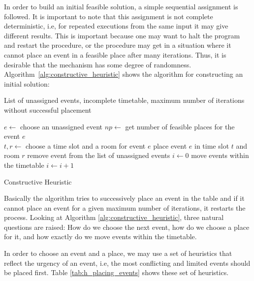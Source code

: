 In order to build an initial feasible solution, a simple sequential assignment is followed. It is important to note that this assignment is not complete deterministic, i.e, for repeated executions from the same input it may give different results. This is important because one may want to halt the program and restart the procedure, or the procedure may get in a situation where it cannot place an event in a feasible place after many iterations. Thus, it is desirable that the mechanism has some degree of randomness. Algorithm~\ref{alg:constructive_heuristic} shows the algorithm for constructing an initial solution:

\begin{algorithm}[t]
\begin{algorithmic}
\Require List of unassigned events, incomplete timetable, maximum number of iterations without successful placement 

	\State\hspace{\algorithmicindent} 
\Else
	\State $e\gets $ choose an unassigned event
	\State $np\gets $ get number of feasible places for the event $e$\\
		\State $t,r \gets $ choose a time slot and a room for event $e$
		\State place event $e$ in time slot $t$ and room $r$
		\State remove event from the list of unassigned events
		\State $i\gets 0$
	\Else
		\State move events within the timetable
		 \State $i\gets i+1$
	\EndIf
\EndIf
\EndWhile

\caption{Constructive Heuristic}\label{alg:constructive_heuristic}
\end{algorithmic}
\end{algorithm}

Basically the algorithm tries to successively place an event in the table and if it cannot place an event for a given maximum number of iterations, it restarts the process. Looking at Algorithm \ref{alg:constructive_heuristic}, three natural questions are raised: How do we choose the next event, how do we choose a place for it, and how exactly do we move events within the timetable.

In order to choose an event and a place, we may use a set of heuristics \citep{rossi2004memetic,bullet_paper,lewis2008survey} that reflect the urgency of an event, i.e, the most conflicting and limited events should be placed first. Table \ref{tab:h_placing_events} shows these set of heuristics.


